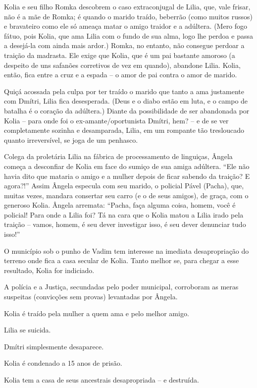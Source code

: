 Kolia e seu filho Romka descobrem o caso extraconjugal de Lilia, que,
vale frisar, não é a mãe de Romka; é quando o marido traído, beberrão
(como muitos russos) e bravateiro como ele só ameaça matar o amigo
traidor e a adúltera. (Mero fogo fátuo, pois Kolia, que ama Lilia com o
fundo de sua alma, logo lhe perdoa e passa a desejá-la com ainda mais
ardor.) Romka, no entanto, não consegue perdoar a traição da madrasta.
Ele exige que Kolia, que é um pai bastante amoroso (a despeito de uns
safanões corretivos de vez em quando), abandone Lilia. Kolia, então,
fica entre a cruz e a espada -- o amor de pai contra o amor de marido.

Quiçá acossada pela culpa por ter traído o marido que tanto a ama
justamente com Dmítri, Lilia fica desesperada. (Deus e o diabo estão em
luta, e o campo de batalha é o coração da adúltera.) Diante da
possibilidade de ser abandonada por Kolia -- para onde foi o
ex-amante/oportunista Dmítri, hem? -- e de se ver completamente sozinha
e desamparada, Lilia, em um rompante tão tresloucado quanto
irreversível, se joga de um penhasco.

Colega da proletária Lilia na fábrica de processamento de linguiças,
Ângela começa a desconfiar de Kolia em face do sumiço de sua amiga
adúltera. ``Ele não havia dito que mataria o amigo e a mulher depois de
ficar sabendo da traição? E agora?!'' Assim Ângela especula com seu
marido, o policial Pável (Pacha), que, muitas vezes, mandara consertar
seu carro (e o de seus amigos), de graça, com o generoso Kolia. Ângela
arremata: ``Pacha, faça alguma coisa, homem, você é policial! Para onde
a Lilia foi? Tá na cara que o Kolia matou a Lilia irado pela traição --
vamos, homem, é seu dever investigar isso, é seu dever denunciar tudo
isso!''

O município sob o punho de Vadim tem interesse na imediata
desapropriação do terreno onde fica a casa secular de Kolia. Tanto
melhor se, para chegar a esse resultado, Kolia for indiciado.

A polícia e a Justiça, secundadas pelo poder municipal, corroboram as
meras suspeitas (convicções sem provas) levantadas por Ângela.

Kolia é traído pela mulher a quem ama e pelo melhor amigo.

Lilia se suicida.

Dmítri simplesmente desaparece.

Kolia é condenado a 15 anos de prisão.

Kolia tem a casa de seus ancestrais desapropriada -- e destruída.

